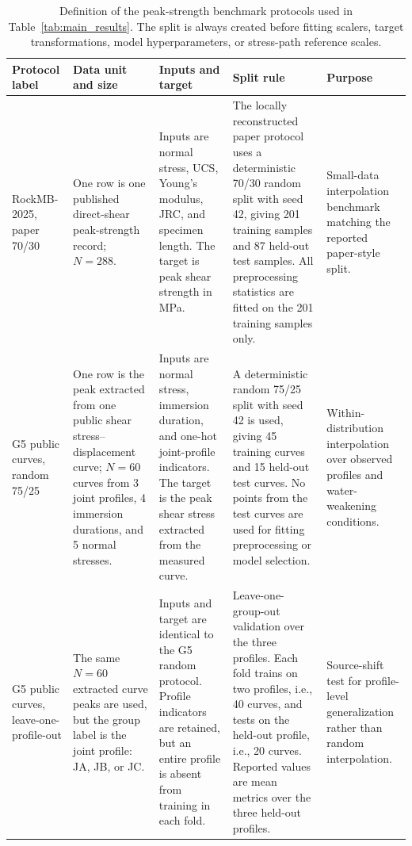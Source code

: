 \begin{table}[t]
\centering
\caption{Definition of the peak-strength benchmark protocols used in Table~\ref{tab:main_results}. The split is always created before fitting scalers, target transformations, model hyperparameters, or stress-path reference scales.}
\label{tab:protocols}
\footnotesize
\setlength{\tabcolsep}{3.2pt}
\begin{tabular}{p{}p{}p{}p{}p{}}
\toprule
Protocol label & Data unit and size & Inputs and target & Split rule & Purpose \\
\midrule
RockMB-2025, paper 70/30 &
One row is one published direct-shear peak-strength record; $N=288$. &
Inputs are normal stress, UCS, Young's modulus, JRC, and specimen length. The target is peak shear strength in MPa. &
The locally reconstructed paper protocol uses a deterministic 70/30 random split with seed 42, giving 201 training samples and 87 held-out test samples. All preprocessing statistics are fitted on the 201 training samples only. &
Small-data interpolation benchmark matching the reported paper-style split. \\
\midrule
G5 public curves, random 75/25 &
One row is the peak extracted from one public shear stress--displacement curve; $N=60$ curves from 3 joint profiles, 4 immersion durations, and 5 normal stresses. &
Inputs are normal stress, immersion duration, and one-hot joint-profile indicators. The target is the peak shear stress extracted from the measured curve. &
A deterministic random 75/25 split with seed 42 is used, giving 45 training curves and 15 held-out test curves. No points from the test curves are used for fitting preprocessing or model selection. &
Within-distribution interpolation over observed profiles and water-weakening conditions. \\
\midrule
G5 public curves, leave-one-profile-out &
The same $N=60$ extracted curve peaks are used, but the group label is the joint profile: JA, JB, or JC. &
Inputs and target are identical to the G5 random protocol. Profile indicators are retained, but an entire profile is absent from training in each fold. &
Leave-one-group-out validation over the three profiles. Each fold trains on two profiles, i.e., 40 curves, and tests on the held-out profile, i.e., 20 curves. Reported values are mean metrics over the three held-out profiles. &
Source-shift test for profile-level generalization rather than random interpolation. \\
\bottomrule
\end{tabular}
\end{table}
